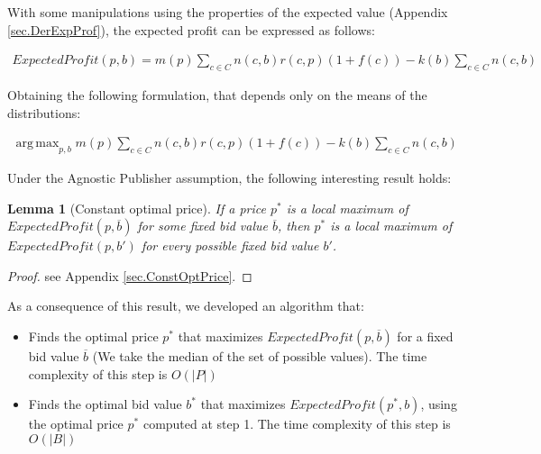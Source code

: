 \documentclass[11pt]{article} %
\DeclareMathOperator*{\argmax}{arg\,max}
\newtheorem*{lemma}{Lemma}
\begin{document}
With some manipulations using the properties of the expected value (Appendix \ref{sec.DerExpProf}), the expected profit can be expressed as follows:

\begin{align*}
ExpectedProfit(p,b)=m(p)\sum_{c \in C}{n(c,b)r(c,p)(1+f(c))}-k(b)\sum_{c \in C}{n(c,b)}
\end{align*}

Obtaining the following formulation, that depends only on the means of the distributions:

\begin{align*}
\argmax_{p,b}{m(p)\sum_{c \in C}{n(c,b)r(c,p)(1+f(c))}-k(b)\sum_{c \in C}{n(c,b)}}
\end{align*}

Under the Agnostic Publisher assumption, the following interesting result holds:

\begin{lemma}[Constant optimal price]
If a price $p^*$ is a local maximum of $ExpectedProfit(p,\overline b)$ for some fixed bid value $\overline b$,  then $p^*$ is a local maximum of $ExpectedProfit(p,b')$  for every possible fixed bid value $b'$.
\end{lemma}
\begin{proof}
see Appendix \ref{sec.ConstOptPrice}.
\end{proof}

As a consequence of this result, we developed an algorithm that:
\begin{itemize}
\item Finds the optimal price $p^*$ that maximizes $ExpectedProfit(p,\overline b)$ for a fixed bid value $\overline b$ (We take the median of the set of possible values). The time complexity of this step is $O(|P|)$
\item Finds the optimal bid value $b^*$ that maximizes $ExpectedProfit(p^*, b)$, using the optimal price $p^*$ computed at step 1. The time complexity of this step is $O(|B|)$
\end{itemize}
\end{document}
